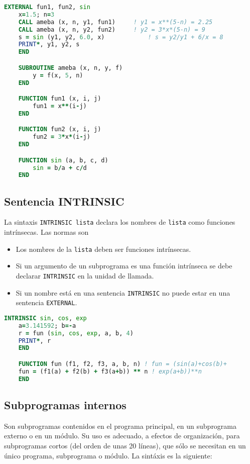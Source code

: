 \begin{lstlisting}[language=Fortran]
	EXTERNAL fun1, fun2, sin
	x=1.5; n=3
	CALL ameba (x, n, y1, fun1)		! y1 = x**(5-n) = 2.25
	CALL ameba (x, n, y2, fun2)	 	! y2 = 3*x*(5-n) = 9
	s = sin (y1, y2, 6.0, x)			! s = y2/y1 + 6/x = 8
	PRINT*, y1, y2, s
	END

	SUBROUTINE ameba (x, n, y, f)
		y = f(x, 5, n)
	END

	FUNCTION fun1 (x, i, j)
		fun1 = x**(i-j)
	END

	FUNCTION fun2 (x, i, j)
		fun2 = 3*x*(i-j)
	END

	FUNCTION sin (a, b, c, d)
		sin = b/a + c/d
	END
\end{lstlisting}

\subsection{Sentencia INTRINSIC}

La sintaxis {\tt INTRINSIC lista} declara los nombres de {\tt lista} como funciones intrínsecas. Las normas son
\begin{itemize}
	\item Los nombres de la {\tt lista} deben ser funciones intrínsecas.
	\item Si un argumento de un subprograma es una función intrínseca se debe declarar {\tt INTRINSIC} en la unidad de llamada. 
	\item Si un nombre está en una sentencia {\tt INTRINSIC} no puede estar en una sentencia {\tt EXTERNAL}.
\end{itemize}

\begin{lstlisting}[language=Fortran]
	INTRINSIC sin, cos, exp
	a=3.141592; b=-a
	r = fun (sin, cos, exp, a, b, 4)
	PRINT*, r
	END

	FUNCTION fun (f1, f2, f3, a, b, n) ! fun = (sin(a)+cos(b)+
	fun = (f1(a) + f2(b) + f3(a+b)) ** n ! exp(a+b))**n	
	END
\end{lstlisting}

\subsection{Subprogramas internos}

Son subprogramas contenidos en el programa principal, en un subprograma externo o en un módulo. Su uso es adecuado, a efectos de organización, para subprogramas cortos (del orden de unas 20 líneas), que sólo se necesitan en un único programa, subprograma o módulo.  La sintáxis es la siguiente:

